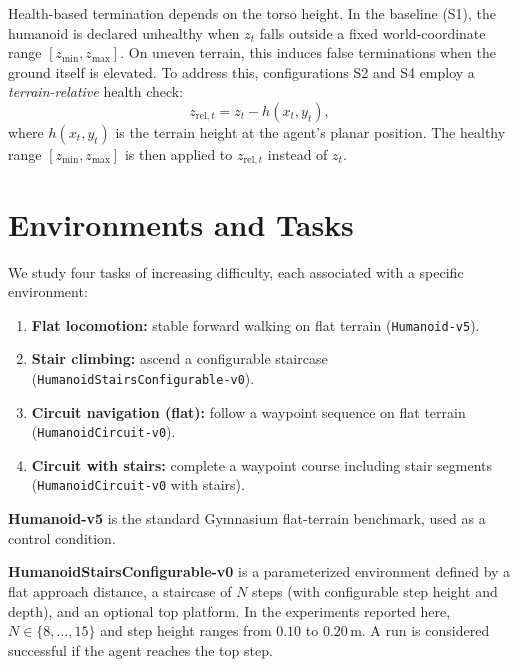 \documentclass[conference]{IEEEtran}
\begin{document}
Health-based termination depends on the torso height. In the baseline (S1), the humanoid is declared unhealthy when $z_t$ falls outside a fixed world-coordinate range $[z_{\min}, z_{\max}]$. On uneven terrain, this induces false terminations when the ground itself is elevated. To address this, configurations S2 and S4 employ a \emph{terrain-relative} health check:
\begin{equation}
\label{eq:terrain_rel_z}
z_{\mathrm{rel},t} = z_t - h(x_t, y_t),
\end{equation}
where $h(x_t, y_t)$ is the terrain height at the agent's planar position. The healthy range $[z_{\min}, z_{\max}]$ is then applied to $z_{\mathrm{rel},t}$ instead of $z_t$.



\section{Environments and Tasks}
\label{sec:environments}

We study four tasks of increasing difficulty, each associated with a specific environment:

\begin{enumerate}
    \item \textbf{Flat locomotion:} stable forward walking on flat terrain (\texttt{Humanoid-v5}).
    \item \textbf{Stair climbing:} ascend a configurable staircase (\texttt{HumanoidStairsConfigurable-v0}).
    \item \textbf{Circuit navigation (flat):} follow a waypoint sequence on flat terrain (\texttt{HumanoidCircuit-v0}).
    \item \textbf{Circuit with stairs:} complete a waypoint course including stair segments (\texttt{HumanoidCircuit-v0} with stairs).
\end{enumerate}

\textbf{Humanoid-v5} is the standard Gymnasium flat-terrain benchmark, used as a control condition.

\textbf{HumanoidStairsConfigurable-v0} is a parameterized environment defined by a flat approach distance, a staircase of $N$ steps (with configurable step height and depth), and an optional top platform. In the experiments reported here, $N \in \{8, \dots, 15\}$ and step height ranges from $0.10$ to $0.20\,$m. A run is considered successful if the agent reaches the top step.
\end{document}
